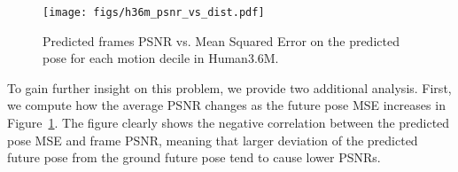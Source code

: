 \documentclass{article}
\begin{document}
\begin{appendix}
\begin{figure}[htb!]
\centering
\vspace{-10pt}
\texttt{[image: figs/h36m\_psnr\_vs\_dist.pdf]}
\vspace{-.3cm}
\caption{Predicted frames PSNR vs. Mean Squared Error on the predicted pose for each motion decile in Human3.6M.}
\label{fig:h36m_corr}
\end{figure}
\vspace{-.3cm}

%
To gain further insight on this problem,  we provide two additional analysis. 
First, we compute how the average PSNR changes as the future pose MSE increases in Figure~\ref{fig:h36m_corr}.
The figure clearly shows the negative correlation between the predicted pose MSE and frame PSNR, meaning that larger deviation of the predicted future pose from the ground future pose tend to cause lower PSNRs.


\end{appendix}
\end{document}
